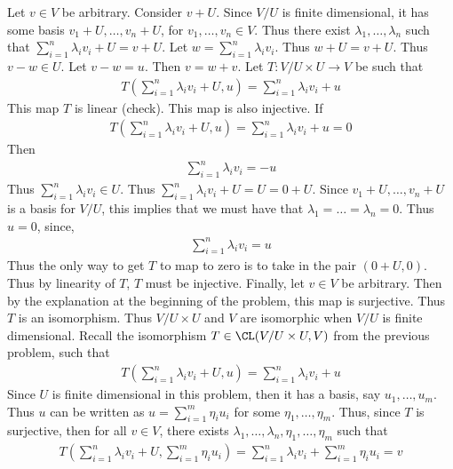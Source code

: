 \documentclass{book}
\begin{document}
\begin{enumerate}[label=\arabic*)]
      Let $v \in V$ be arbitrary. Consider $v + U$. Since $V/U$ is finite dimensional, it has some basis $v_1 + U, \dots, v_n + U$, for $v_1, \dots, v_n \in V$. Thus there exist $\lambda_1,
      \dots, \lambda_n$ such that $\sum_{i = 1}^{n}\lambda_iv_i + U = v + U$. Let $w = \sum_{i = 1}^{n}\lambda_iv_i$. Thus $w + U = v + U$. Thus $v - w \in U$. Let $v - w = u$. Then $v = w +
      v$. Let $T: V/U \times U \to V$ be such that
      \begin{align*}
        T(\sum_{i = 1}^{n}\lambda_iv_i + U, u) = \sum_{i = 1}^{n}\lambda_iv_i + u
      \end{align*}
      This map $T$ is linear (check). This map is also injective. If 
      \begin{align*}
        T(\sum_{i = 1}^{n}\lambda_iv_i + U, u) = \sum_{i = 1}^{n}\lambda_iv_i + u = 0
      \end{align*}
      Then
      \begin{align*}
        \sum_{i = 1}^{n}\lambda_iv_i = -u
      \end{align*}
      Thus $\sum_{i = 1}^{n}\lambda_iv_i \in U$. Thus $\sum_{i = 1}^{n}\lambda_iv_i + U = U = 0 + U$. Since $v_1 + U, \dots, v_n + U$ is a basis for $V/U$, this implies that we must have
      that $\lambda_1 = \dots = \lambda_n = 0$. Thus $u = 0$, since, 
      \begin{align*}
        \sum_{i = 1}^{n}\lambda_iv_i = u
      \end{align*}
      Thus the only way to get $T$ to map to zero is to take in the pair $(0 + U, 0)$. Thus by linearity of $T$, $T$ must be injective. Finally, let $v \in V$ be arbitrary. Then by the
      explanation at the beginning of the problem, this map is surjective. Thus $T$ is an isomorphism. Thus $V/U \times U$ and $V$ are isomorphic when $V/U$ is finite dimensional.
    \ii
      Recall the isomorphism $T \in \CL(V/U\times U, V)$ from the previous problem, such that
      \begin{align*}
        T(\sum_{i = 1}^{n}\lambda_iv_i + U, u) = \sum_{i = 1}^{n}\lambda_iv_i + u
      \end{align*}
      Since $U$ is finite dimensional in this problem, then it has a basis, say $u_1, \dots, u_m$. Thus $u$ can be written as $u = \sum_{i = 1}^{m}\eta_iu_i$ for some $\eta_1, \dots,
      \eta_m$. Thus, since $T$ is surjective, then for all $v \in V$, there exists $\lambda_1, \dots, \lambda_n, \eta_1, \dots, \eta_m$ such that
      \begin{align*}
        T(\sum_{i = 1}^{n}\lambda_iv_i + U, \sum_{i = 1}^{m}\eta_iu_i) = \sum_{i = 1}^{n}\lambda_iv_i + \sum_{i = 1}^{m}\eta_iu_i = v

\end{align*}
\end{enumerate}
\end{document}
